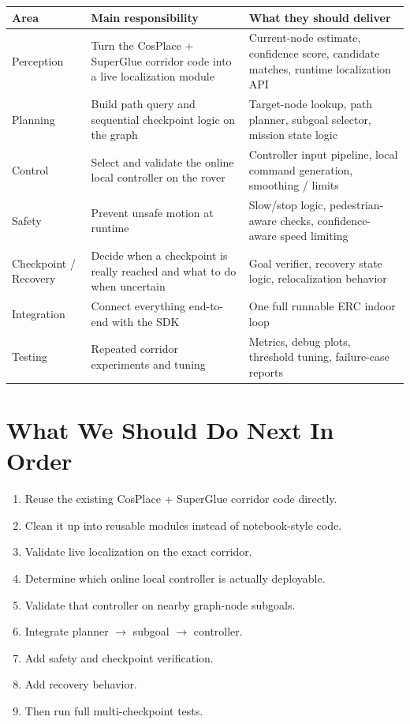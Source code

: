 \documentclass[11pt,a4paper]{article}
\begin{document}
\begin{tabularx}{\textwidth}{p{} p{} X}
\toprule
\textbf{Area} & \textbf{Main responsibility} & \textbf{What they should deliver} \\
\midrule
Perception & Turn the CosPlace + SuperGlue corridor code into a live localization module & Current-node estimate, confidence score, candidate matches, runtime localization API \\
Planning & Build path query and sequential checkpoint logic on the graph & Target-node lookup, path planner, subgoal selector, mission state logic \\
Control & Select and validate the online local controller on the rover & Controller input pipeline, local command generation, smoothing / limits \\
Safety & Prevent unsafe motion at runtime & Slow/stop logic, pedestrian-aware checks, confidence-aware speed limiting \\
Checkpoint / Recovery & Decide when a checkpoint is really reached and what to do when uncertain & Goal verifier, recovery state logic, relocalization behavior \\
Integration & Connect everything end-to-end with the SDK & One full runnable ERC indoor loop \\
Testing & Repeated corridor experiments and tuning & Metrics, debug plots, threshold tuning, failure-case reports \\
\bottomrule
\end{tabularx}


\section{What We Should Do Next In Order}

\begin{enumerate}[nosep]
  \item Reuse the existing CosPlace + SuperGlue corridor code directly.
  \item Clean it up into reusable modules instead of notebook-style code.
  \item Validate live localization on the exact corridor.
  \item Determine which online local controller is actually deployable.
  \item Validate that controller on nearby graph-node subgoals.
  \item Integrate planner $\rightarrow$ subgoal $\rightarrow$ controller.
  \item Add safety and checkpoint verification.
  \item Add recovery behavior.
  \item Then run full multi-checkpoint tests.
\end{enumerate}
\end{document}

